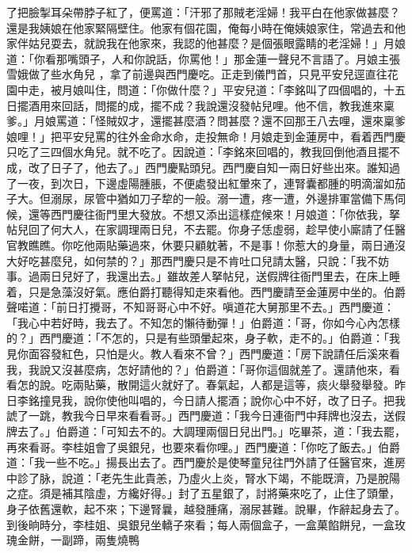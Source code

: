 \begin{showcontents}{}
了把臉掣耳朵帶脖子紅了，便罵道：「汗邪了那賊老淫婦！我平白在他家做甚麼？還是我姨娘在他家緊隔壁住。他家有個花園，俺每小時在俺姨娘家住，常過去和他家伴姑兒耍去，就說我在他家來，我認的他甚麼？是個張眼露睛的老淫婦！」月娘道：「你看那嘴頭子，人和你說話，你罵他！」那金蓮一聲兒不言語了。月娘主張雪娥做了些水角兒 ，拿了前邊與西門慶吃。正走到儀門首，只見平安兒逕直往花園中走，被月娘叫住，問道：「你做什麼？」平安兒道：「李銘叫了四個唱的，十五日擺酒用來回話，問擺的成，擺不成？我說還沒發帖兒哩。他不信，教我進來稟爹。」月娘罵道：「怪賊奴才，還擺甚麼酒？問甚麼？還不回那王八去哩，還來稟爹娘哩！」把平安兒罵的往外金命水命，走投無命！月娘走到金蓮房中，看着西門慶只吃了三四個水角兒。就不吃了。因說道：「李銘來回唱的，教我回倒他酒且擺不成，改了日子了，他去了。」西門慶點頭兒。西門慶自知一兩日好些出來。誰知過了一夜，到次日，下邊虛陽腫脹，不便處發出紅暈來了，連腎囊都腫的明滴溜如茄子大。但溺尿，尿管中猶如刀子犂的一般。溺一遭，疼一遭，外邊排軍當備下馬伺候，還等西門慶往衙門里大發放。不想又添出這樣症候來！月娘道：「你依我，拏帖兒回了何大人，在家調理兩日兒，不去罷。你身子恁虛弱，趁早使小廝請了任醫官教瞧瞧。你吃他兩貼藥過來，休要只顧躭著，不是事！你惹大的身量，兩日通沒大好吃甚麼兒，如何禁的？」那西門慶只是不肯吐口兒請太醫，只說：「我不妨事。過兩日兒好了，我還出去。」雖故差人拏帖兒，送假牌往衙門里去，在床上睡着，只是急藻沒好氣。應伯爵打聽得知走來看他。西門慶請至金蓮房中坐的。伯爵聲喏道：「前日打攪哥，不知哥哥心中不好。嗔道花大舅那里不去。」西門慶道：「我心中若好時，我去了。不知怎的懶待動彈！」伯爵道：「哥，你如今心內怎樣的？」西門慶道：「不怎的，只是有些頭暈起來，身子軟，走不的。」伯爵道：「我見你面容發紅色，只怕是火。教人看來不曾？」西門慶道：「房下說請任后溪來看我，我說又沒甚麼病，怎好請他的？」伯爵道：「哥你這個就差了。還請他來，看看怎的說。吃兩貼藥，散開這火就好了。春氣起，人都是這等，痰火舉發舉發。昨日李銘撞見我，說你使他叫唱的，今日請人擺酒；說你心中不好，改了日子。把我諕了一跳，教我今日早來看看哥。」西門慶道：「我今日連衙門中拜牌也沒去，送假牌去了。」伯爵道：「可知去不的。大調理兩個日兒出門。」吃畢茶，道：「我去罷，再來看哥。李桂姐會了吳銀兒，也要來看你哩。」西門慶道：「你吃了飯去。」伯爵道：「我一些不吃。」揚長出去了。西門慶於是使琴童兒往門外請了任醫官來，進房中診了脉，說道：「老先生此貴恙，乃虛火上炎，腎水下竭，不能既濟，乃是脫陽之症。須是補其陰虛，方纔好得。」封了五星銀了，討將藥來吃了，止住了頭暈，身子依舊還軟，起不來；下邊腎曩，越發腫痛，溺尿甚難。說畢，作辭起身去了。到後晌時分，李桂姐、吳銀兒坐轎子來看；每人兩個盒子，一盒菓餡餅兒，一盒玫瑰金餅，一副蹄，兩隻燒鴨 
\end{showcontents}
